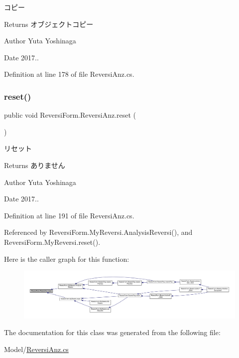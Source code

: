 コピー 

\begin{DoxyReturn}{Returns}
オブジェクトコピー 
\end{DoxyReturn}
\begin{DoxyAuthor}{Author}
Yuta Yoshinaga 
\end{DoxyAuthor}
\begin{DoxyDate}{Date}
2017.. 
\end{DoxyDate}


Definition at line 178 of file Reversi\+Anz.\+cs.

\mbox{\label{class_reversi_form_1_1_reversi_anz_a2428d6f4fd60b95d28876b1f0f8ce151}} 
\subsubsection{\texorpdfstring{reset()}{reset()}}
{\footnotesize\ttfamily public void Reversi\+Form.\+Reversi\+Anz.\+reset (\begin{DoxyParamCaption}{ }\end{DoxyParamCaption})}



リセット 

\begin{DoxyReturn}{Returns}
ありません 
\end{DoxyReturn}
\begin{DoxyAuthor}{Author}
Yuta Yoshinaga 
\end{DoxyAuthor}
\begin{DoxyDate}{Date}
2017.. 
\end{DoxyDate}


Definition at line 191 of file Reversi\+Anz.\+cs.



Referenced by Reversi\+Form.\+My\+Reversi.\+Analysis\+Reversi(), and Reversi\+Form.\+My\+Reversi.\+reset().

Here is the caller graph for this function\+:\nopagebreak
\begin{figure}[H]
\begin{center}
\leavevmode
\includegraphics[width=350pt]{class_reversi_form_1_1_reversi_anz_a2428d6f4fd60b95d28876b1f0f8ce151_icgraph}
\end{center}
\end{figure}


The documentation for this class was generated from the following file\+:\begin{DoxyCompactItemize}
\item 
Model/\hyperlink{_reversi_anz_8cs}{Reversi\+Anz.\+cs}\end{DoxyCompactItemize}

